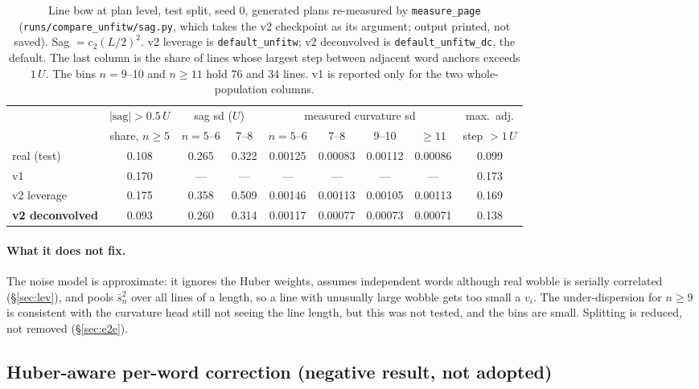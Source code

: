 \documentclass[11pt,a4paper]{article}
\newcommand{\U}{\ensuremath{U}}
\newcommand{\src}[1]{{\footnotesize\texttt{#1}}}
\begin{document}
\begin{table}[H]\centering\small
\setlength{\tabcolsep}{4pt}
\begin{tabular}{lcccccccc}
\toprule
 & $|\text{sag}|>0.5\,\U$ & \multicolumn{2}{c}{sag sd (\U)} & \multicolumn{4}{c}{measured curvature sd} & max.\ adj.\\
 & share, $n\ge5$ & $n=5$--6 & 7--8 & $n=5$--6 & 7--8 & 9--10 & $\ge11$ & step $>1\,\U$\\
\midrule
real (test)          & 0.108 & 0.265 & 0.322 & 0.00125 & 0.00083 & 0.00112 & 0.00086 & 0.099\\
v1                   & 0.170 & ---   & ---   & ---     & ---     & ---     & ---     & 0.173\\
v2 leverage          & 0.175 & 0.358 & 0.509 & 0.00146 & 0.00113 & 0.00105 & 0.00113 & 0.169\\
\textbf{v2 deconvolved} & 0.093 & 0.260 & 0.314 & 0.00117 & 0.00077 & 0.00073 & 0.00071 & 0.138\\
\bottomrule
\end{tabular}
\caption{Line bow at plan level, test split, seed 0, generated plans
re-measured by \texttt{measure\_page} (\src{runs/compare\_unfitw/sag.py},
which takes the v2 checkpoint as its argument; output printed, not saved).
Sag $=c_2(L/2)^2$. v2 leverage is \texttt{default\_unfitw}; v2 deconvolved
is \texttt{default\_unfitw\_dc}, the default. The last column is the share of
lines whose largest step between adjacent word anchors exceeds $1\,\U$. The
bins $n=9$--10 and $n\ge11$ hold 76 and 34 lines. v1 is reported only for the
two whole-population columns.}
\label{tab:sag}
\end{table}

\paragraph{What it does not fix.} The noise model is approximate: it ignores
the Huber weights, assumes independent words although real wobble is
serially correlated (\S\ref{sec:lev}), and pools $\bar s^2_n$ over all lines
of a length, so a line with unusually large wobble gets too small a $v_i$. The
under-dispersion for $n\ge9$ is consistent with the curvature head still not
seeing the line length, but this was not tested, and the bins are small.
Splitting is reduced, not removed (\S\ref{sec:e2e}).

\subsection{Huber-aware per-word correction (negative result, not adopted)}
\label{sec:huber}
\end{document}
